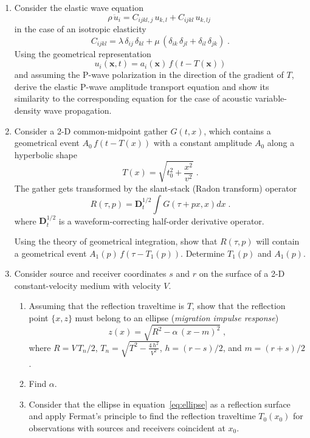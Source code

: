 \begin{enumerate}
\item Consider the elastic wave equation
\begin{equation}
  \label{eq:ewave}
  \rho\,\ddot{u}_i = C_{ijkl,j}\,u_{k,l} + C_{ijkl}\,u_{k,lj}\;
\end{equation}
in the case of an isotropic elasticity
\begin{equation}
  \label{eq:lame}
  C_{ijkl} = \lambda\,\delta_{ij}\,\delta_{kl} + 
  \mu\,(\delta_{ik}\,\delta_{jl} + \delta_{il}\,\delta_{jk})\;.
\end{equation}
Using the geometrical representation
\begin{equation}
  u_i(\mathbf{x},t) = a_i(\mathbf{x})\,f\left(t-T(\mathbf{x})\right)
  \label{eq:gwave}
\end{equation}
and assuming the P-wave polarization in the direction of the gradient
of $T$, derive the elastic P-wave amplitude transport equation and
show its similarity to the corresponding equation for the case of
acoustic variable-density wave propagation.
\item Consider a 2-D common-midpoint gather $G(t,x)$, which
  contains a geometrical event $A_0\,f\left(t-T(x)\right)$ with a
  constant amplitude $A_0$ along a hyperbolic shape
\begin{equation}
\label{eq:hyper}
T(x) = \sqrt{t_0^2+\frac{x^2}{v^2}}\;.
\end{equation}
The gather gets transformed by the slant-stack (Radon transform) operator
\begin{equation}
\label{eq:radon}
R(\tau,p) = \mathbf{D}_t^{1/2} \int G(\tau + p x, x) d x\;.
\end{equation}
where $ \mathbf{D}_t^{1/2}$ is a waveform-correcting half-order
derivative operator.

Using the theory of geometrical integration, show that $R(\tau,p)$
will contain a geometrical event $A_1(p)\,f\left(\tau-T_1(p)\right)$.
Determine $T_1(p)$ and $A_1(p)$.
\item Consider source and receiver coordinates $s$ and $r$ on the
  surface of a 2-D constant-velocity medium with velocity
  $V$. 

  \begin{enumerate}
  \item Assuming that the reflection traveltime is $T$, show that the
    reflection point $\{x,z\}$ must belong to an ellipse (\emph{migration
      impulse response})
    \begin{equation}
      \label{eq:ellipse}
      z(x) = \sqrt{R^2 - \alpha\,(x-m)^2}\;,
    \end{equation}
    where $R=V\,T_n/2$, $T_n=\sqrt{T^2-\frac{4\,h^2}{V^2}}$, $h=(r-s)/2$, and $m=(r+s)/2$.
  \item Find $\alpha$.
  \item Consider that the ellipse in equation~\ref{eq:ellipse} as a
    reflection surface and apply Fermat's principle to find the reflection
    traveltime $T_0(x_0)$ for observations with sources and receivers coincident at $x_0$.
  \end{enumerate}
  
\end{enumerate}

